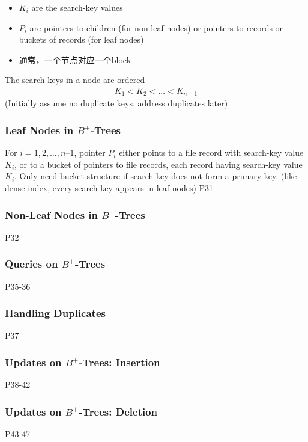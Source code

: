 \begin{itemize}
    \item $K_i$ are the search-key values
    \item $P_i$ are pointers to children (for non-leaf nodes) or pointers to records or buckets of records (for leaf nodes)
    \item 通常，一个节点对应一个block
\end{itemize}
The search-keys in a node are ordered
\begin{align*}
    K_1 < K_2 <\dots <K_{n-1}
\end{align*}
(Initially assume no duplicate keys, address duplicates later)

\subsubsection{Leaf Nodes in \texorpdfstring{$B^+$}.-Trees}
For $i = 1, 2, \dots, n–1$, pointer $P_i$ either points to a file record with search-key value $K_i$, or to a bucket of pointers to file records, each record having search-key value $K_i$. Only need bucket structure if search-key does not form a primary key. (like dense index, every search key appears in leaf nodes)
 P31

\subsubsection{Non-Leaf Nodes in \texorpdfstring{$B^+$}.-Trees}
 P32


\subsubsection{Queries on \texorpdfstring{$B^+$}.-Trees}
 P35-36

\subsubsection{Handling Duplicates}
 P37

\subsubsection{Updates on \texorpdfstring{$B^+$}.-Trees: Insertion}
 P38-42

\subsubsection{Updates on \texorpdfstring{$B^+$}.-Trees: Deletion}
 P43-47

